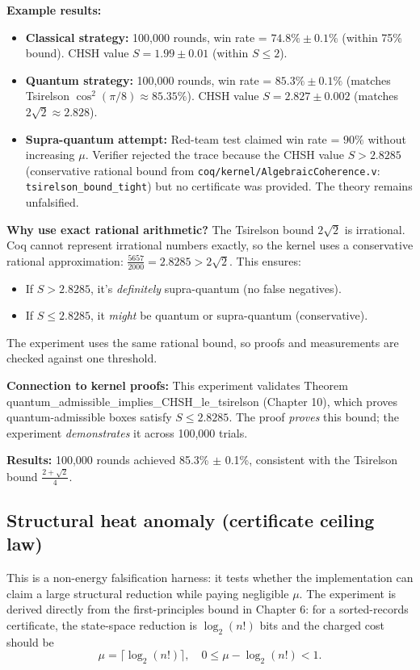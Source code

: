 \textbf{Example results:}
\begin{itemize}
    \item \textbf{Classical strategy:} 100,000 rounds, win rate = $74.8\% \pm 0.1\%$ (within 75\% bound). CHSH value $S = 1.99 \pm 0.01$ (within $S \leq 2$).
    
    \item \textbf{Quantum strategy:} 100,000 rounds, win rate = $85.3\% \pm 0.1\%$ (matches Tsirelson $\cos^2(\pi/8) \approx 85.35\%$). CHSH value $S = 2.827 \pm 0.002$ (matches $2\sqrt{2} \approx 2.828$).
    
    \item \textbf{Supra-quantum attempt:} Red-team test claimed win rate = $90\%$ without increasing $\mu$. Verifier rejected the trace because the CHSH value $S > 2.8285$ (conservative rational bound from \texttt{coq/kernel/AlgebraicCoherence.v}: \texttt{tsirelson\_bound\_tight}) but no certificate was provided. The theory remains unfalsified.
\end{itemize}

\textbf{Why use exact rational arithmetic?} The Tsirelson bound $2\sqrt{2}$ is irrational. Coq cannot represent irrational numbers exactly, so the kernel uses a conservative rational approximation: $\frac{5657}{2000} = 2.8285 > 2\sqrt{2}$. This ensures:
\begin{itemize}
    \item If $S > 2.8285$, it's \textit{definitely} supra-quantum (no false negatives).
    \item If $S \leq 2.8285$, it \textit{might} be quantum or supra-quantum (conservative).
\end{itemize}
The experiment uses the same rational bound, so proofs and measurements are checked against one threshold.

\textbf{Connection to kernel proofs:} This experiment validates Theorem quantum\_admissible\_implies\_CHSH\_le\_tsirelson (Chapter 10), which proves quantum-admissible boxes satisfy $S \leq 2.8285$. The proof \textit{proves} this bound; the experiment \textit{demonstrates} it across 100,000 trials.


\textbf{Results:} 100,000 rounds achieved 85.3\% $\pm$ 0.1\%, consistent with the Tsirelson bound $\frac{2+\sqrt{2}}{4}$.

\subsection{Structural heat anomaly (certificate ceiling law)}
This is a non-energy falsification harness: it tests whether the implementation can claim a large structural reduction while paying negligible $\mu$. The experiment is derived directly from the first-principles bound in Chapter 6: for a sorted-records certificate, the state-space reduction is $\log_2(n!)$ bits and the charged cost should be
\[
\mu = \lceil \log_2(n!) \rceil,\quad 0 \le \mu-\log_2(n!) < 1.
\]

